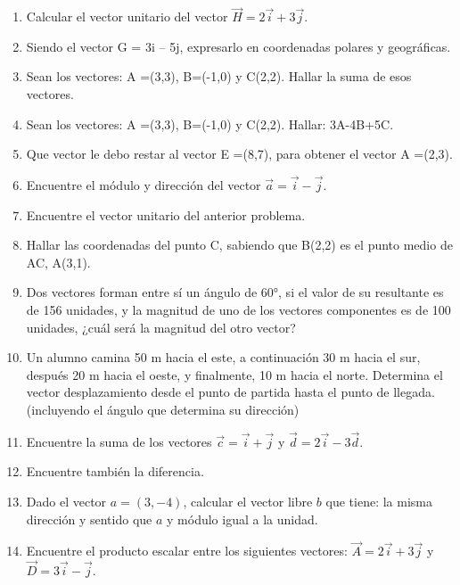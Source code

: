\begin{enumerate}
 
 \item Calcular el vector unitario del vector $\vec{H} = 2\vec{i}+3\vec{j}$.
 
 \item Siendo el vector G = 3i – 5j, expresarlo en coordenadas polares y geográficas.
 
 \item Sean los vectores: A =(3,3), B=(-1,0) y C(2,2). Hallar la suma de esos vectores.
 
\item Sean los vectores: A =(3,3), B=(-1,0) y C(2,2). Hallar: 3A-4B+5C.

\item Que vector le debo restar al vector E =(8,7), para obtener el vector A =(2,3).
 
 \item Encuentre el módulo y dirección del vector $\vec{a}= \vec{i} - \vec{j}$.
 
 \item Encuentre el vector unitario del anterior problema.
 
 \item Hallar las coordenadas del punto C, sabiendo que B(2,2) es el punto medio de AC, A(3,1).
 
 \item Dos vectores forman entre sí un ángulo de 60°, si el valor de su resultante es de 156 unidades, y la magnitud de uno 
de los vectores componentes es de 100 unidades, ¿cuál será la magnitud del otro vector?
 
 \item Un alumno camina 50 m hacia el este, a continuación 30 m hacia el sur, después 20 m hacia el oeste, y finalmente, 10 m 
hacia el norte. Determina el vector desplazamiento desde el punto de partida hasta el punto de llegada. (incluyendo el ángulo que 
determina su dirección)
 
 \item Encuentre la suma de los vectores $\vec{c}=\vec{i}+\vec{j}$ y $\vec{d}=2\vec{i}-3\vec{d}$.
 
 \item Encuentre también la diferencia.
 
 \item Dado el vector $a =(3,-4)$, calcular el vector libre $b$ que tiene: la misma dirección y sentido que $a$ y módulo 
igual a la unidad.

\item Encuentre el producto escalar entre los siguientes vectores: $\vec{A} = 2\vec{i} + 3\vec{j}$ y $\vec{D} = 3\vec{i} - 
\vec{j}$.
 

\end{enumerate}
